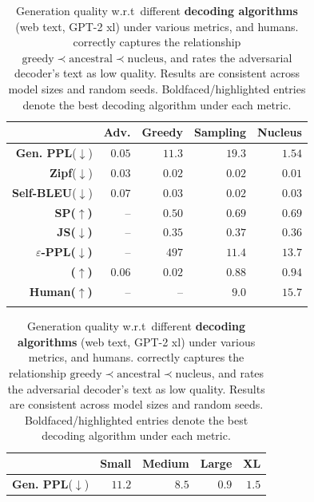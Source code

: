 \documentclass{article}
\theoremstyle{definition}
\renewcommand \epsilon \varepsilon
\newcommand{\name}{{\fontfamily{bch}\selectfont{\textsc{Mauve}}}\xspace}
\newcommand{\tabemph}[1]{\cellcolor{lightmauve!30}\textcolor{black!50!royalazure}{#1}}%
\begin{document}
%
\begin{table}[t]
\RawFloats
\footnotesize
\begin{minipage}[t]{0.47\linewidth}
\setlength{\tabcolsep}{2pt}
\begin{center}
{\renewcommand{\arraystretch}{1.2}%
\begin{tabular}{rrrrr}
\toprule
& \textbf{Adv.}&\textbf{Greedy} & \textbf{Sampling} & \textbf{Nucleus} \\\midrule
\textbf{Gen. PPL}($\downarrow$) & \tabemph{$\mathbf{0.05}$} & $11.3$ & $19.3$ & $1.54$\\
\textbf{Zipf}($\downarrow$)& $0.03$ & $0.02$ & $0.02$ & \tabemph{$\mathbf{0.01}$}\\
\textbf{Self-BLEU}($\downarrow$)& $0.07$ & $0.03$ & \tabemph{$\mathbf{0.02}$} & $0.03$\\
 \bf   SP($\uparrow$) & -- & $0.50$ &\tabemph{$\mathbf{0.69}$} & $0.69$\\
 \bf JS($\downarrow$) &-- & \tabemph{$\mathbf{0.35}$} & $0.37$ & $0.36$\\
 \bf $\epsilon$-PPL($\downarrow$) & --& $497$ & \tabemph{$\mathbf{11.4}$}  & $13.7$\\
\bf \name($\uparrow$) & $0.06$ & $0.02$ & $0.88$ & \tabemph{$\mathbf{0.94}$}\\\hline
 \bf Human($\uparrow$) & --& -- & $9.0$ & \tabemph{$\mathbf{15.7}$}\\
 \bottomrule
\addlinespace[0.4em] 
\end{tabular}
}
\caption{ \small 
Generation quality w.r.t\ different \textbf{decoding algorithms} (web text, GPT-2 xl) under various metrics, and humans. 
\name correctly captures the relationship $\text{greedy}\prec\text{ancestral}\prec{\text{nucleus}}$, and rates the adversarial decoder's text as low quality.
Results are consistent across model sizes and random seeds. %
Boldfaced/highlighted entries denote the best decoding algorithm under each metric.
%
}
\label{tbl:decoding}
\end{center}
\end{minipage}
\hfill
\begin{minipage}[t]{.47\linewidth}
\setlength{\tabcolsep}{3pt}
\begin{center}
{\renewcommand{\arraystretch}{1.2}%
\begin{tabular}{rrrrr}
\toprule
& \textbf{Small}&\textbf{Medium} & \textbf{Large} & \textbf{XL} \\\midrule
\textbf{Gen. PPL}($\downarrow$) & $11.2$ & $8.5$ & \tabemph{$\mathbf{0.9}$} & $1.5$\\

\end{tabular}}
\end{center}
\end{minipage}
\end{table}
\end{document}
